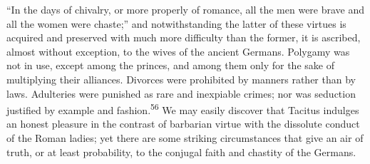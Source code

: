 


“In the days of chivalry, or more properly of romance, all the
men were brave and all the women were chaste;” and
notwithstanding the latter of these virtues is acquired and
preserved with much more difficulty than the former, it is
ascribed, almost without exception, to the wives of the ancient
Germans. Polygamy was not in use, except among the princes, and
among them only for the sake of multiplying their alliances.
Divorces were prohibited by manners rather than by laws.
Adulteries were punished as rare and inexpiable crimes; nor was
seduction justified by example and fashion.\textsuperscript{56} We may easily
discover that Tacitus indulges an honest pleasure in the contrast
of barbarian virtue with the dissolute conduct of the Roman
ladies; yet there are some striking circumstances that give an
air of truth, or at least probability, to the conjugal faith and
chastity of the Germans.



